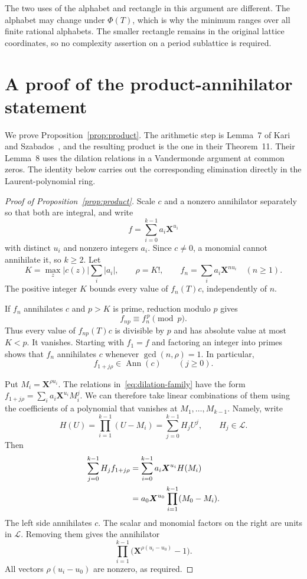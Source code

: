\documentclass[11pt,a4paper,reqno]{amsart}
\theoremstyle{remark}
\newcommand{\LL}{\mathcal L}
\newcommand{\mon}[1]{\boldsymbol X^{#1}}
\DeclareMathOperator{\Ann}{Ann}
\numberwithin{equation}{section}
\begin{document}
The two uses of the alphabet and rectangle in this argument are different. The alphabet may change under $\Phi(T)$, which is why the minimum ranges over all finite rational alphabets. The smaller rectangle remains in the original lattice coordinates, so no complexity assertion on a period sublattice is required.

\appendix
\section{A proof of the product-annihilator statement}\label{app:product}
We prove Proposition~\ref{prop:product}. The arithmetic step is Lemma~7 of Kari and Szabados~\cite{KS}, and the resulting product is the one in their Theorem~11. Their Lemma~8 uses the dilation relations in a Vandermonde argument at common zeros. The identity below carries out the corresponding elimination directly in the Laurent-polynomial ring.

\begin{proof}[Proof of Proposition~\ref{prop:product}]
Scale $c$ and a nonzero annihilator separately so that both are integral, and write
\[
 f=\sum_{i=0}^{k-1}a_i\mon{u_i}
\]
with distinct $u_i$ and nonzero integers $a_i$. Since $c\ne0$, a monomial cannot annihilate it, so $k\ge2$. Let
\[
 K=\max_z|c(z)|\sum_i|a_i|,\qquad \rho=K!,\qquad
 f_n=\sum_i a_i\mon{nu_i}\quad(n\ge1).
\]
The positive integer $K$ bounds every value of $f_n(T)c$, independently of $n$.

If $f_n$ annihilates $c$ and $p>K$ is prime, reduction modulo $p$ gives
\[
 f_{np}\equiv f_n^{\,p}\pmod p.
\]
Thus every value of $f_{np}(T)c$ is divisible by $p$ and has absolute value at most $K<p$. It vanishes. Starting with $f_1=f$ and factoring an integer into primes shows that $f_n$ annihilates $c$ whenever $\gcd(n,\rho)=1$. In particular,
\begin{equation}\label{eq:dilation-family}
 f_{1+j\rho}\in\Ann(c)\qquad(j\ge0).
\end{equation}

Put $M_i=\mon{\rho u_i}$. The relations in~\eqref{eq:dilation-family} have the form
$f_{1+j\rho}=\sum_i a_i\mon{u_i}M_i^j$. We can therefore take linear combinations of them using the coefficients of a polynomial that vanishes at $M_1,\ldots,M_{k-1}$. Namely, write
\[
 H(U)=\prod_{i=1}^{k-1}(U-M_i)=\sum_{j=0}^{k-1}H_jU^j,
 \qquad H_j\in\LL.
\]
Then
\begin{align}
 \sum_{j=0}^{k-1}H_jf_{1+j\rho}
 &=\sum_{i=0}^{k-1}a_i\mon{u_i}H(M_i)\notag\\
 &=a_0\mon{u_0}\prod_{i=1}^{k-1}(M_0-M_i).
 \label{eq:interpolation}
\end{align}
The left side annihilates $c$. The scalar and monomial factors on the right are units in $\LL$. Removing them gives the annihilator
\[
 \prod_{i=1}^{k-1}\bigl(\mon{\rho(u_i-u_0)}-1\bigr).
\]
All vectors $\rho(u_i-u_0)$ are nonzero, as required.
\end{proof}
\end{document}
